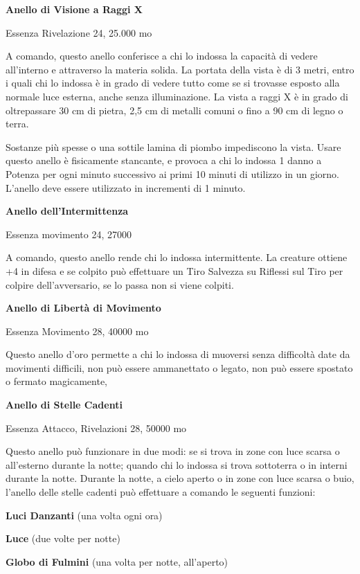 \documentclass[a4paper,11pt,twoside,openany]{book}
\begin{document}
\textbf{Anello di Visione a Raggi X}

Essenza Rivelazione 24, 25.000 mo

A comando, questo anello conferisce a chi lo indossa la capacità di vedere all'interno e attraverso la materia solida. La portata della vista è di 3 metri, entro i quali chi lo indossa è in grado di vedere tutto come se si trovasse esposto alla normale luce esterna, anche senza illuminazione. La vista a raggi X è in grado di oltrepassare 30 cm di pietra, 2,5 cm di metalli comuni o fino a 90 cm di legno o terra.

Sostanze più spesse o una sottile lamina di piombo impediscono la vista. Usare questo anello è fisicamente stancante, e provoca a chi lo indossa 1 danno a Potenza per ogni minuto successivo ai primi 10 minuti di utilizzo in un giorno. L'anello deve essere utilizzato in incrementi di 1 minuto.

\textbf{Anello dell'Intermittenza}

Essenza movimento 24, 27000

A comando, questo anello rende chi lo indossa intermittente. La creature ottiene +4 in difesa e se colpito può effettuare un Tiro Salvezza su Riflessi sul Tiro per colpire dell'avversario, se lo passa non si viene colpiti.

\textbf{Anello di Libertà di Movimento}

Essenza Movimento 28, 40000 mo

Questo anello d'oro permette a chi lo indossa di muoversi senza difficoltà date da movimenti difficili, non può essere ammanettato o legato, non può essere spostato o fermato magicamente,

\textbf{Anello di Stelle Cadenti}

Essenza Attacco, Rivelazioni 28, 50000 mo

Questo anello può funzionare in due modi: se si trova in zone con luce scarsa o all'esterno durante la notte; quando chi lo indossa si trova sottoterra o in interni durante la notte. Durante la notte, a cielo aperto o in zone con luce scarsa o buio, l'anello delle stelle cadenti può effettuare a comando le seguenti funzioni:

\textbf{Luci Danzanti} (una volta ogni ora)

\textbf{Luce} (due volte per notte)

\textbf{Globo di Fulmini} (una volta per notte, all'aperto)
\end{document}
